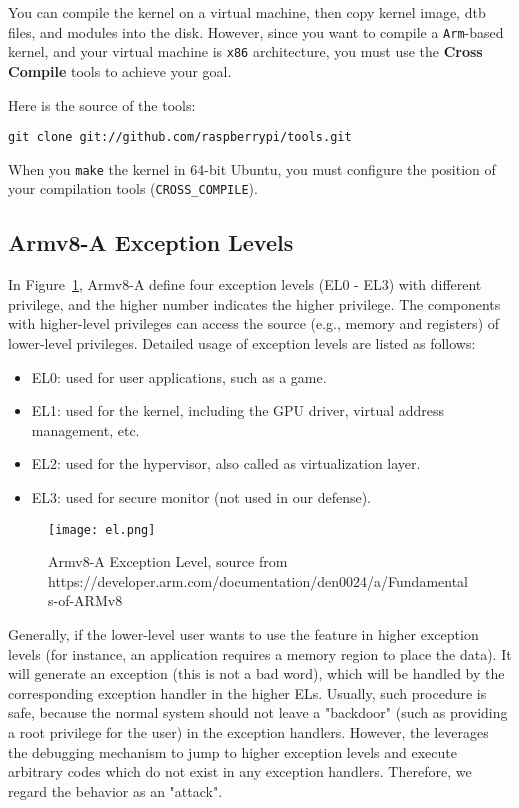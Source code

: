 You can compile the kernel on a virtual machine, then copy kernel image, dtb files, and modules into the disk.
However, since you want to compile a \texttt{Arm}-based kernel, and your virtual machine is \texttt{x86} architecture, you must use the \textbf{Cross Compile} tools to achieve your goal.

Here is the source of the tools:

\begin{lstlisting}
git clone git://github.com/raspberrypi/tools.git
\end{lstlisting}

When you \texttt{make} the kernel in 64-bit Ubuntu, you must configure the position of your compilation tools (\texttt{CROSS\_COMPILE}).



\subsection{Armv8-A Exception Levels}

In Figure~\ref{fig:armel}, Armv8-A define four exception levels (EL0 - EL3) with different privilege, and the higher number indicates the higher privilege.
The components with higher-level privileges can access the source (e.g., memory and registers) of lower-level privileges.
Detailed usage of exception levels are listed as follows:

\begin{itemize}
	\item EL0: used for user applications, such as a game.
	\item EL1: used for the kernel, including the GPU driver, virtual address management, etc.
	\item EL2: used for the hypervisor, also called as virtualization layer.
	\item EL3: used for secure monitor (not used in our defense).
\end{itemize}

\begin{figure}[htb]
	\centering
	\texttt{[image: el.png]}
	\caption{Armv8-A Exception Level, source from
		https://developer.arm.com/documentation/den0024/a/Fundamentals-of-ARMv8}
	\label{fig:armel}
\end{figure}


Generally, if the lower-level user wants to use the feature in higher exception levels (for instance, an application requires a memory region to place the data).
It will generate an exception (this is not a bad word), which will be handled by the corresponding exception handler in the higher ELs.
Usually, such procedure is safe, because the normal system should not leave a "backdoor" (such as providing a root privilege for the user) in the exception handlers. However, the \TheName{} leverages the debugging mechanism to jump to higher exception levels and execute arbitrary codes which do not exist in any exception handlers. Therefore, we regard the behavior as an "attack".

